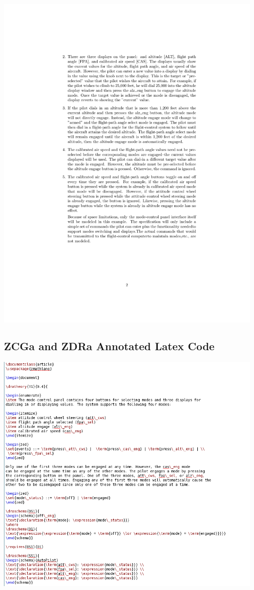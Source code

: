 \noindent \includegraphics[clip, trim=4cm 4cm 4cm 4.2cm, scale=0.9]{examples/semiform/0comp2.pdf}

\subsection{ZCGa and ZDRa Annotated Latex Code}
\includegraphics[scale=0.5]{examples/semiform/1n2a.png}

